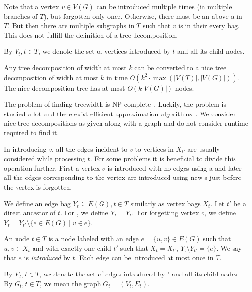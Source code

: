 
Note that a vertex \( v \in V(G) \) can be introduced multiple times
(in multiple branches of \( T \)),
but forgotten only once.
%
Otherwise, there must be an \IntroduceVertexNode{} above a \ForgetVertexNode{} in~\( T \).
But then there are multiple subgraphs in \( T \)
such that \( v \) is in their every bag.
This does not fulfill the definition of a tree decomposition.

By \( V_t, t \in T \), we denote the set of vertices introduced by \( t \)
and all its child nodes.
%
\begin{lemma}
	Any tree decomposition of width at most \( k \) can be converted to
	a nice tree decomposition of width at most \( k \)
	in time \( O(k^2 \cdot \max(|V(T)|, |V(G)|)) \).
	The nice decomposition tree has at most \( O(k|V(G)|) \) nodes.
\end{lemma}

The problem of finding treewidth is NP-complete~\cite{tree_width_np_complete}.
Luckily, the problem is studied a lot and
there exist efficient approximation algorithms~\cite{tree_width_approximation}.
We consider nice tree decompositions as given along with a graph
and do not consider runtime required to find it.


In \IntroduceVertexNode{} introducing \( v \), all the edges incident to \( v \)
to vertices in \( X_{t'} \) are usually considered while processing \( t \).
%
For some problems it is beneficial to divide this operation further.
First a vertex \( v \) is introduced with no edges using a \IntroduceVertexNode{}
and later all the edges corresponding to the vertex are introduced using new \IntroduceEdgeNode{}s
just before the vertex is forgotten.

We define an edge bag \( Y_t \subseteq E(G), t \in T \) similarly as vertex bags \( X_t \).
%
Let \( t' \) be a direct ancestor of \( t \).
For \IntroduceVertexNode{}, we define \( Y_t = Y_{t'} \).
For \ForgetVertexNode{} forgetting vertex \( v \),
we define \( Y_t = Y_{t'} \setminus \{ e \in E(G) \mid v \in e\} \).
%
\begin{definition}
	An \IntroduceEdgeNode{} node \( t \in T \) is a node
	labeled with an edge \( e = \{u, v\} \in E(G) \)
	such that \( u, v \in X_t \) and with exactly one child \( t' \)
	such that \( X_t = X_{t'} \), \( Y_t \setminus Y_{t'} = \{e\} \).
	We say that \( e \) is \emph{introduced} by \( t \).
	Each edge can be introduced at most once in \( T \).
\end{definition}
%
By \( E_t, t \in T \), we denote the set of edges introduced by \( t \)
and all its child nodes.
By \( G_t, t \in T \), we mean the graph \( G_t = (V_t, E_t) \).

